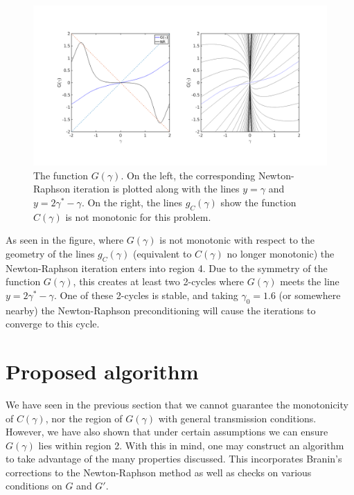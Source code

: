 \documentclass{article}
\begin{document}
\begin{figure}
	\includegraphics[width=\textwidth]{exp9_02.png}
	\caption{The function $G(\gamma)$.
	On the left, the corresponding Newton-Raphson iteration is plotted along with the lines $y=\gamma$ and $y=2 \gamma^* - \gamma$.
	On the right, the lines $g_C(\gamma)$ show the function $C(\gamma)$ is not monotonic for this problem.}
	\label{fig:exsin}
\end{figure}

As seen in the figure, where $G(\gamma)$ is not monotonic with respect to the geometry of the lines $g_C(\gamma)$ (equivalent to $C(\gamma)$ no longer monotonic) the Newton-Raphson iteration enters into region 4.
Due to the symmetry of the function $G(\gamma)$, this creates at least two 2-cycles where $G(\gamma)$ meets the line $y = 2 \gamma^* - \gamma$.
One of these 2-cycles is stable, and taking $\gamma_0 = 1.6$ (or somewhere nearby) the Newton-Raphson preconditioning will cause the iterations to converge to this cycle.

\section{Proposed algorithm}
\label{sec:algo}

We have seen in the previous section that we cannot guarantee the monotonicity of $C(\gamma)$, nor the region of $G(\gamma)$ with general transmission conditions.
However, we have also shown that under certain assumptions we can ensure $G(\gamma)$ lies within region 2.
With this in mind, one may construct an algorithm to take advantage of the many properties discussed.
This incorporates Branin's corrections to the Newton-Raphson method as well as checks on various conditions on $G$ and $G'$.
\end{document}
